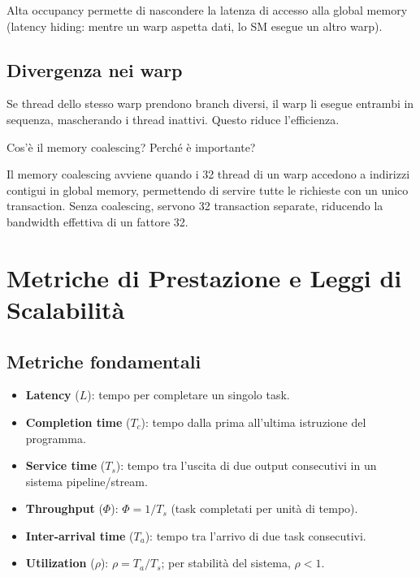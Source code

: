 \documentclass[11pt,a4paper]{article}
\theoremstyle{remark}
\newenvironment{esercizio}[1][]{%
  \begin{tcolorbox}[breakable,title={\textbf{Esercizio / Domanda d'esame}\ifx&#1&\else: #1\fi},
    colback=yellow!5!white, colframe=orange!75!black, fonttitle=\small\bfseries]%
}{%
  \end{tcolorbox}%
}
\newenvironment{risposta}{%
  \begin{tcolorbox}[breakable,title={\textbf{Risposta}},
    colback=green!5!white, colframe=green!50!black, fonttitle=\small\bfseries]%
}{%
  \end{tcolorbox}%
}
\begin{document}
Alta occupancy permette di nascondere la latenza di accesso alla global memory (latency hiding: mentre un warp aspetta dati, lo SM esegue un altro warp).

\subsection{Divergenza nei warp}

Se thread dello stesso warp prendono branch diversi, il warp li esegue entrambi in sequenza, mascherando i thread inattivi. Questo riduce l'efficienza.

\begin{esercizio}
Cos'è il memory coalescing? Perché è importante?
\end{esercizio}
\begin{risposta}
Il memory coalescing avviene quando i 32 thread di un warp accedono a indirizzi contigui in global memory, permettendo di servire tutte le richieste con un unico transaction. Senza coalescing, servono 32 transaction separate, riducendo la bandwidth effettiva di un fattore 32.
\end{risposta}

\section{Metriche di Prestazione e Leggi di Scalabilità}

\subsection{Metriche fondamentali}

\begin{itemize}
  \item \textbf{Latency} ($L$): tempo per completare un singolo task.
  \item \textbf{Completion time} ($T_c$): tempo dalla prima all'ultima istruzione del programma.
  \item \textbf{Service time} ($T_s$): tempo tra l'uscita di due output consecutivi in un sistema pipeline/stream.
  \item \textbf{Throughput} ($\Phi$): $\Phi = 1/T_s$ (task completati per unità di tempo).
  \item \textbf{Inter-arrival time} ($T_a$): tempo tra l'arrivo di due task consecutivi.
  \item \textbf{Utilization} ($\rho$): $\rho = T_a / T_s$; per stabilità del sistema, $\rho < 1$.
\end{itemize}
\end{document}
